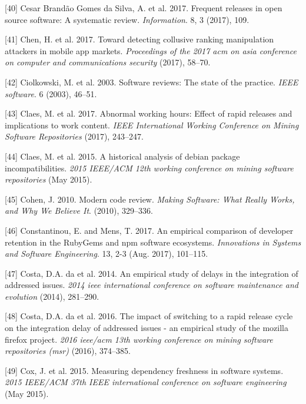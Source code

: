 \documentclass[]{book}
\begin{document}
\hypertarget{ref-cesar2017a}{}
{[}40{]} Cesar Brandão Gomes da Silva, A. et al. 2017. Frequent releases
in open source software: A systematic review. \emph{Information}. 8, 3
(2017), 109.

\hypertarget{ref-chen2017toward}{}
{[}41{]} Chen, H. et al. 2017. Toward detecting collusive ranking
manipulation attackers in mobile app markets. \emph{Proceedings of the
2017 acm on asia conference on computer and communications security}
(2017), 58--70.

\hypertarget{ref-ciolkowski2003software}{}
{[}42{]} Ciolkowski, M. et al. 2003. Software reviews: The state of the
practice. \emph{IEEE software}. 6 (2003), 46--51.

\hypertarget{ref-claes2017a}{}
{[}43{]} Claes, M. et al. 2017. Abnormal working hours: Effect of rapid
releases and implications to work content. \emph{IEEE International
Working Conference on Mining Software Repositories} (2017), 243--247.

\hypertarget{ref-Claes2015}{}
{[}44{]} Claes, M. et al. 2015. A historical analysis of debian package
incompatibilities. \emph{2015 IEEE/ACM 12th working conference on mining
software repositories} (May 2015).

\hypertarget{ref-cohen2010modern}{}
{[}45{]} Cohen, J. 2010. Modern code review. \emph{Making Software: What
Really Works, and Why We Believe It}. (2010), 329--336.

\hypertarget{ref-Constantinou2017}{}
{[}46{]} Constantinou, E. and Mens, T. 2017. An empirical comparison of
developer retention in the RubyGems and npm software ecosystems.
\emph{Innovations in Systems and Software Engineering}. 13, 2-3 (Aug.
2017), 101--115.

\hypertarget{ref-da2014a}{}
{[}47{]} Costa, D.A. da et al. 2014. An empirical study of delays in the
integration of addressed issues. \emph{2014 ieee international
conference on software maintenance and evolution} (2014), 281--290.

\hypertarget{ref-da2016a}{}
{[}48{]} Costa, D.A. da et al. 2016. The impact of switching to a rapid
release cycle on the integration delay of addressed issues - an
empirical study of the mozilla firefox project. \emph{2016 ieee/acm 13th
working conference on mining software repositories (msr)} (2016),
374--385.

\hypertarget{ref-Cox2015}{}
{[}49{]} Cox, J. et al. 2015. Measuring dependency freshness in software
systems. \emph{2015 IEEE/ACM 37th IEEE international conference on
software engineering} (May 2015).
\end{document}
